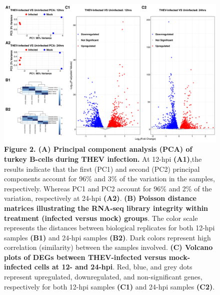 \documentclass[
]{article}
\begin{document}
\begin{figure}
\centering
\includegraphics{results/r/figures/sample_corr_figure.png}
\caption{\textbf{Figure 2. (A) Principal component analysis (PCA) of
turkey B-cells during THEV infection.} At 12-hpi \textbf{(A1)},the
results indicate that the first (PC1) and second (PC2) principal
components account for 96\% and 3\% of the variation in the samples,
respectively. Whereas PC1 and PC2 account for 96\% and 2\% of the
variation, respectively at 24-hpi \textbf{(A2)}. \textbf{(B) Poisson
distance matrices illustrating the RNA-seq library integrity within
treatment (infected versus mock) groups}. The color scale represents the
distances between biological replicates for both 12-hpi samples
\textbf{(B1)} and 24-hpi samples \textbf{(B2)}. Dark colors represent
high correlation (similarity) between the samples involved. \textbf{(C)
Volcano plots of DEGs between THEV-infected versus mock-infected cells
at 12- and 24-hpi}. Red, blue, and grey dots represent upregulated,
downregulated, and non-significant genes, respectively for both 12-hpi
samples \textbf{(C1)} and 24-hpi samples \textbf{(C2)}.}
\end{figure}
\end{document}
